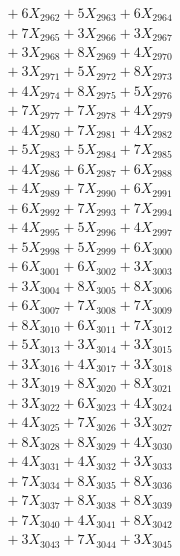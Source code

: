\documentclass[a4paper,10pt]{article}
\begin{document}
{\begin{align}
&\;  + 6 X_{2962} + 5 X_{2963} + 6 X_{2964} \\[0.3ex]
&\;  + 7 X_{2965} + 3 X_{2966} + 3 X_{2967} \\[0.3ex]
&\;  + 3 X_{2968} + 8 X_{2969} + 4 X_{2970} \\[0.3ex]
&\;  + 3 X_{2971} + 5 X_{2972} + 8 X_{2973} \\[0.3ex]
&\;  + 4 X_{2974} + 8 X_{2975} + 5 X_{2976} \\[0.3ex]
&\;  + 7 X_{2977} + 7 X_{2978} + 4 X_{2979} \\[0.5ex]\allowbreak
&\;  + 4 X_{2980} + 7 X_{2981} + 4 X_{2982} \\[0.3ex]
&\;  + 5 X_{2983} + 5 X_{2984} + 7 X_{2985} \\[0.3ex]
&\;  + 4 X_{2986} + 6 X_{2987} + 6 X_{2988} \\[0.3ex]
&\;  + 4 X_{2989} + 7 X_{2990} + 6 X_{2991} \\[0.3ex]
&\;  + 6 X_{2992} + 7 X_{2993} + 7 X_{2994} \\[0.3ex]
&\;  + 4 X_{2995} + 5 X_{2996} + 4 X_{2997} \\[0.3ex]
&\;  + 5 X_{2998} + 5 X_{2999} + 6 X_{3000} \\[0.3ex]
&\;  + 6 X_{3001} + 6 X_{3002} + 3 X_{3003} \\[0.3ex]
&\;  + 3 X_{3004} + 8 X_{3005} + 8 X_{3006} \\[0.3ex]
&\;  + 6 X_{3007} + 7 X_{3008} + 7 X_{3009} \\[0.5ex]\allowbreak
&\;  + 8 X_{3010} + 6 X_{3011} + 7 X_{3012} \\[0.3ex]
&\;  + 5 X_{3013} + 3 X_{3014} + 3 X_{3015} \\[0.3ex]
&\;  + 3 X_{3016} + 4 X_{3017} + 3 X_{3018} \\[0.3ex]
&\;  + 3 X_{3019} + 8 X_{3020} + 8 X_{3021} \\[0.3ex]
&\;  + 3 X_{3022} + 6 X_{3023} + 4 X_{3024} \\[0.3ex]
&\;  + 4 X_{3025} + 7 X_{3026} + 3 X_{3027} \\[0.3ex]
&\;  + 8 X_{3028} + 8 X_{3029} + 4 X_{3030} \\[0.3ex]
&\;  + 4 X_{3031} + 4 X_{3032} + 3 X_{3033} \\[0.3ex]
&\;  + 7 X_{3034} + 8 X_{3035} + 8 X_{3036} \\[0.3ex]
&\;  + 7 X_{3037} + 8 X_{3038} + 8 X_{3039} \\[0.5ex]\allowbreak
&\;  + 7 X_{3040} + 4 X_{3041} + 8 X_{3042} \\[0.3ex]
&\;  + 3 X_{3043} + 7 X_{3044} + 3 X_{3045} \\[0.3ex]

\end{align}}
\end{document}
